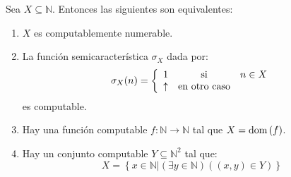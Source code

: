 \documentclass[12pt]{report}
\newcounter{it}
\theoremstyle{largebreak}
\newcommand\cf[3]{\ensuremath{#1:#2\rightarrow#3}}
\newcommand{\dom}[1]{\textup{dom}\left(#1 \right)}
\begin{document}
    \begin{theor}
        Sea $X\subseteq\mathbb{N}$. Entonces las siguientes son equivalentes:
        \begin{enumerate}[label = \textit{(\arabic*)}]
            \item $X$ es computablemente numerable.
            \item La función semicaracterística $\sigma_X$ dada por:
            \begin{equation*}
                \sigma_X(n)=\left\{
                    \begin{array}{lcr}
                        1 & \textup{ si } & n\in X \\
                        \uparrow & \textup{en otro caso} & \\
                    \end{array}
                \right.
            \end{equation*}
            es computable.
            \item Hay una función computable $\cf{f}{\mathbb{N}}{\mathbb{N}}$ tal que $X=\dom{f}$.
            \item Hay un conjunto computable $Y\subseteq\mathbb{N}^2$ tal que:
            \begin{equation*}
                X=\left\{x\in\mathbb{N}\Big|(\exists y\in\mathbb{N})((x,y)\in Y) \right\}
            \end{equation*}
        \end{enumerate}
    \end{theor}
\end{document}
